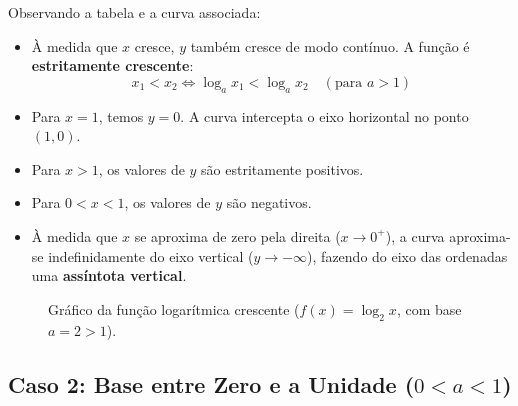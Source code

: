 \documentclass[12pt,a4paper]{report}
\begin{document}
	Observando a tabela e a curva associada:
	\begin{itemize}[label=$\circ$]
		\item À medida que $x$ cresce, $y$ também cresce de modo contínuo. A função é \textbf{estritamente crescente}:
		$$x_1 < x_2 \iff \log_a x_1 < \log_a x_2 \quad (\text{para } a > 1)$$
		\item Para $x = 1$, temos $y = 0$. A curva intercepta o eixo horizontal no ponto $(1, 0)$.
		\item Para $x > 1$, os valores de $y$ são estritamente positivos.
		\item Para $0 < x < 1$, os valores de $y$ são negativos.
		\item À medida que $x$ se aproxima de zero pela direita ($x \to 0^+$), a curva aproxima-se indefinidamente do eixo vertical ($y \to -\infty$), fazendo do eixo das ordenadas uma \textbf{assíntota vertical}.
	\end{itemize}
	
	\begin{figure}[htbp]
		\centering
		\caption{Gráfico da função logarítmica crescente ($f(x) = \log_2 x$, com base $a = 2 > 1$).}
		\label{fig:log_crescente}
	\end{figure}
	
	\subsection{Caso 2: Base entre Zero e a Unidade ($0 < a < 1$)}
	
\end{document}
